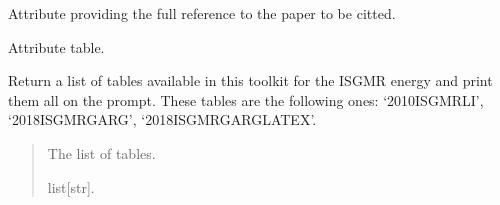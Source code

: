 \documentclass[letterpaper,10pt,english]{sphinxmanual}
\begin{document}
\begin{fulllineitems}
\begin{fulllineitems}
\end{fulllineitems}


\begin{fulllineitems}
\label{\detokenize{source/api/setup_ISGMR:nucleardatapy.setup_ISGMR.SetupISGMR.ref}}
\pysigstartsignatures
\pysigline
{}
\pysigstopsignatures
\sphinxAtStartPar
Attribute providing the full reference to the paper to be citted.

\end{fulllineitems}


\begin{fulllineitems}
\label{\detokenize{source/api/setup_ISGMR:nucleardatapy.setup_ISGMR.SetupISGMR.table}}
\pysigstartsignatures
\pysigline
{}
\pysigstopsignatures
\sphinxAtStartPar
Attribute table.

\end{fulllineitems}


\end{fulllineitems}


\begin{fulllineitems}
\label{\detokenize{source/api/setup_ISGMR:nucleardatapy.setup_ISGMR.tables_isgmr}}
\pysigstartsignatures
\pysiglinewithargsret
{}
{}
{}
\pysigstopsignatures
\sphinxAtStartPar
Return a list of tables available in this toolkit for the ISGMR energy and
print them all on the prompt. These tables are the following
ones: ‘2010\sphinxhyphen{}ISGMR\sphinxhyphen{}LI’, ‘2018\sphinxhyphen{}ISGMR\sphinxhyphen{}GARG’, ‘2018\sphinxhyphen{}ISGMR\sphinxhyphen{}GARG\sphinxhyphen{}LATEX’.
\begin{quote}\begin{description}
\sphinxAtStartPar
The list of tables.

\sphinxAtStartPar
list{[}str{]}.

\end{description}\end{quote}

\end{fulllineitems}
\end{document}
